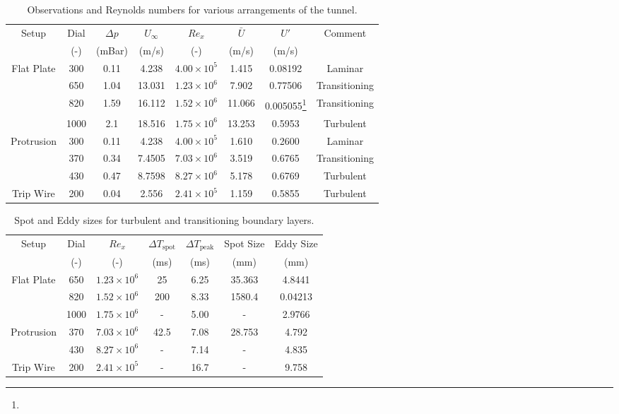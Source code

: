 \documentclass{article}
\begin{document}
\begin{table}[H]
    \centering
    \begin{tabular}{cccccccc}
        \hline
        \multirow{2}{*}{Setup} &  Dial &  $\Delta p$ &  $U_{\infty}$ &  $Re_x$ & $\bar{U}$ & $U'$ & \multirow{2}{*}{Comment} \\
        &(-)&(mBar)&(m/s)&(-)&(m/s)&(m/s)&  \\
        \hline
        \hline
        \multirow{4}{*}{Flat Plate} & 300 & 0.11 & 4.238 & $4.00 \times 10^5$ & 1.415 & 0.08192 & Laminar \\
        & 650 & 1.04 & 13.031 & $1.23 \times 10^6$ & 7.902 & 0.77506 & Transitioning \\
        & 820 & 1.59 & 16.112 & $1.52 \times 10^6$ & 11.066 & 0.005055\footnote[1]{}  & Transitioning \\
        & 1000 & 2.1 & 18.516 & $1.75 \times 10^6$ & 13.253 & 0.5953 & Turbulent \\
        \hline
        \hline
        \multirow{3}{*}{Protrusion} & 300 & 0.11 & 4.238 & $4.00 \times 10^5$ & 1.610 & 0.2600 & Laminar \\
        & 370 & 0.34 & 7.4505 & $7.03 \times 10^6$ & 3.519 & 0.6765 & Transitioning \\
        & 430 & 0.47 & 8.7598 & $8.27 \times 10^6$ & 5.178 & 0.6769 & Turbulent \\
        \hline
        \hline
        \multirow{1}{*}{Trip Wire} & 200 & 0.04 & 2.556 & $2.41 \times 10^5$ & 1.159 & 0.5855 & Turbulent \\
        \hline
    \end{tabular}
    \caption{Observations and Reynolds numbers for various arrangements of the tunnel.}
    \label{tab:observations}
\end{table}

\begin{table}[H]
    \centering
    \begin{tabular}{ccccccc}
        \hline
        \multirow{2}{*}{Setup} & Dial & $Re_x$ & $\Delta T_{\text{spot}}$ & $\Delta T_{\text{peak}}$ & Spot Size & Eddy Size \\
        & (-) & (-) & (ms) & (ms) & (mm) & (mm) \\
        \hline
        \hline
        \multirow{3}{*}{Flat Plate} & 650 & $1.23 \times 10^6$ & 25 & 6.25 & 35.363 & 4.8441 \\
        & 820 & $1.52 \times 10^6$ & 200 & 8.33 & 1580.4 & 0.04213\footnotemark \\
        & 1000 & $1.75 \times 10^6$ & - & 5.00 & - & 2.9766 \\
        \hline
        \hline
        \multirow{2}{*}{Protrusion} & 370 & $7.03 \times 10^6$ & 42.5 & 7.08 & 28.753 & 4.792        \\
        & 430 & $8.27 \times 10^6$ & - & 7.14 & - & 4.835 \\
        \hline
        \hline
        \multirow{1}{*}{Trip Wire} & 200 & $2.41 \times 10^5$ & - & 16.7 & - & 9.758 \\
        \hline
    \end{tabular}
    \caption{Spot and Eddy sizes for turbulent and transitioning boundary layers.}
    \label{tab:spot_sizes}
\end{table}
\end{document}
